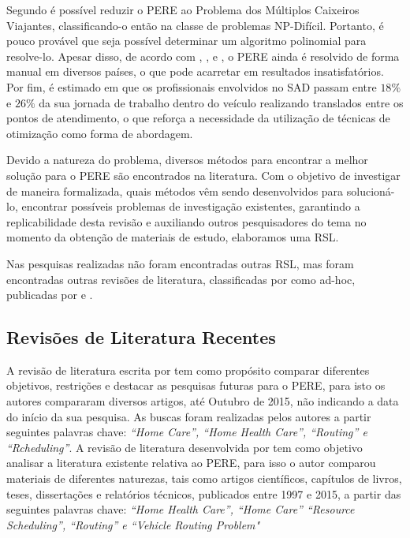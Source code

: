 Segundo  é possível reduzir o PERE ao Problema dos Múltiplos Caixeiros Viajantes, classificando-o então na classe de problemas NP-Difícil. Portanto, é pouco provável que seja possível determinar um algoritmo polinomial para resolve-lo.
Apesar disso, de acordo com , , e , o \ac{PERE} ainda é resolvido de forma manual em diversos países, o que pode acarretar em resultados insatisfatórios. 
Por fim, é estimado em  que os profissionais envolvidos no \ac{SAD} passam entre $18\%$ e $26\%$ da sua jornada de trabalho dentro do veículo realizando translados entre os pontos de atendimento, o que reforça a necessidade da utilização de técnicas de otimização como forma de abordagem.

Devido a natureza do problema, diversos métodos para encontrar a melhor solução para o \ac{PERE} são encontrados na literatura. Com o objetivo de investigar de maneira formalizada, quais métodos vêm sendo desenvolvidos para solucioná-lo, encontrar  possíveis problemas de investigação existentes, garantindo a replicabilidade desta revisão e  auxiliando outros pesquisadores do tema no momento da obtenção de materiais de estudo, elaboramos uma \ac{RSL}.

Nas pesquisas realizadas não foram encontradas outras \ac{RSL}, mas foram encontradas outras revisões de literatura, classificadas por  como ad-hoc,  publicadas por  e .

\subsection{\esp Revisões de Literatura Recentes}

A revisão de literatura escrita por  tem como propósito comparar diferentes objetivos, restrições e destacar as pesquisas futuras para o \ac{PERE}, para isto os autores compararam diversos artigos, até Outubro de 2015, não indicando a data do início da sua pesquisa. As buscas foram realizadas pelos autores a partir seguintes palavras chave: \textit{``Home Care'', ``Home Health Care'', ``Routing'' e ``Rcheduling''}. 
A revisão de literatura desenvolvida por  tem como objetivo analisar a literatura existente relativa ao \ac{PERE}, para isso o autor comparou  materiais de diferentes naturezas, tais como artigos científicos, capítulos de livros, teses, dissertações e relatórios técnicos, publicados entre 1997 e 2015, a partir das seguintes palavras chave: \textit{ ``Home Health Care'', ``Home Care'' ``Resource  Scheduling'',  ``Routing'' e ``Vehicle Routing Problem"}


